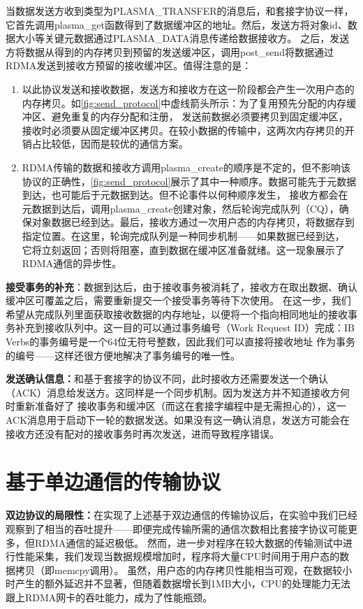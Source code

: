当数据发送方收到类型为PLASMA\_TRANSFER的消息后，和套接字协议一样，它首先调用plasma\_get函数得到了数据缓冲区的地址。然后，发送方将对象id、数据大小等关键元数据通过PLASMA\_DATA消息传递给数据接收方。
之后，发送方将数据从得到的内存拷贝到预留的发送缓冲区，调用post\_send将数据通过RDMA发送到接收方预留的接收缓冲区。值得注意的是：

\begin{enumerate}
	\item 以此协议发送和接收数据，发送方和接收方在这一阶段都会产生一次用户态的内存拷贝。如\autoref{fig:send_protocol}中虚线箭头所示：为了复用预先分配的内存缓冲区、避免重复的内存分配和注册，
	发送前数据必须要拷贝到固定缓冲区，接收时必须要从固定缓冲区拷贝。在较小数据的传输中，这两次内存拷贝的开销占比较低，因而是较优的通信方案。
	\item RDMA传输的数据和接收方调用plasma\_create的顺序是不定的，但不影响该协议的正确性，\autoref{fig:send_protocol}展示了其中一种顺序。数据可能先于元数据到达，也可能后于元数据到达。但不论事件以何种顺序发生，
	接收方都会在元数据到达后，调用plasma\_create创建对象，然后轮询完成队列（CQ），确保对象数据已经到达。最后，接收方通过一次用户态的内存拷贝，将数据存到指定位置。在这里，轮询完成队列是一种同步机制——如果数据已经到达，
	它将立刻返回；否则将阻塞，直到数据在缓冲区准备就绪。这一现象展示了RDMA通信的异步性。
\end{enumerate}

\textbf{接受事务的补充}：数据到达后，由于接收事务被消耗了，接收方在取出数据、确认缓冲区可覆盖之后，需要重新提交一个接受事务等待下次使用。
在这一步，我们希望从完成队列里面获取接收数据的内存地址，以便将一个指向相同地址的接收事务补充到接收队列中。这一目的可以通过事务编号（Work Request ID）完成：IB Verbs的事务编号是一个64位无符号整数，因此我们可以直接将接收地址
作为事务的编号——这样还很方便地解决了事务编号的唯一性。

\textbf{发送确认信息：}和基于套接字的协议不同，此时接收方还需要发送一个确认（ACK）消息给发送方。这同样是一个同步机制。因为发送方并不知道接收方何时重新准备好了
接收事务和缓冲区（而这在套接字编程中是无需担心的），这一ACK消息用于启动下一轮的数据发送。如果没有这一确认消息，发送方可能会在接收方还没有配对的接收事务时再次发送，进而导致程序错误。

\section{基于单边通信的传输协议}

\textbf{双边协议的局限性：}在实现了上述基于双边通信的传输协议后，在实验中我们已经观察到了相当的吞吐提升——即便完成传输所需的通信次数相比套接字协议可能更多，但RDMA通信的延迟极低。
然而，进一步对程序在较大数据的传输测试中进行性能采集，我们发现当数据规模增加时，程序将大量CPU时间用于用户态的数据拷贝（即memcpy调用）。
虽然，用户态的内存拷贝性能相当可观，在数据较小时产生的额外延迟并不显著，但随着数据增长到1MB大小，CPU的处理能力无法跟上RDMA网卡的吞吐能力，成为了性能瓶颈。

